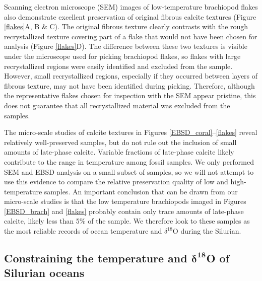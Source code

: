 \documentclass{article}
\newcommand{\deltao}{$\delta^{18}$}
\begin{document}
Scanning electron microscope (SEM) images of low-temperature brachiopod flakes also demonstrate excellent preservation of original fibrous calcite textures (Figure \ref{flakes}A, B \& C). The original fibrous texture clearly contrasts with the rough recrystallized texture covering part of a flake that would not have been chosen for analysis (Figure \ref{flakes}D). The difference between these two textures is visible under the microscope used for picking brachiopod flakes, so flakes with large recrystallized regions were easily identified and excluded from the sample. However, small recrystallized regions, especially if they occurred between layers of fibrous texture, may not have been identified during picking. Therefore, although the representative flakes chosen for inspection with the SEM appear pristine, this does not guarantee that all recrystallized material was excluded from the samples.

The micro-scale studies of calcite textures in Figures \ref{EBSD_coral}--\ref{flakes} reveal relatively well-preserved samples, but do not rule out the inclusion of small amounts of late-phase calcite. Variable fractions of late-phase calcite likely contribute to the range in temperature among fossil samples. We only performed SEM and EBSD analysis on a small subset of samples, so we will not attempt to use this evidence to compare the relative preservation quality of low and high-temperature samples. An important conclusion that can be drawn from our micro-scale studies is that the low temperature brachiopods imaged in Figures \ref{EBSD_brach} and \ref{flakes} probably contain only trace amounts of late-phase calcite, likely less than 5\% of the sample. We therefore look to these samples as the most reliable records of ocean temperature and \deltao O during the Silurian. 

\subsection{Constraining the temperature and $\mathbf{\delta^{18}}$O of Silurian oceans}

\end{document}
